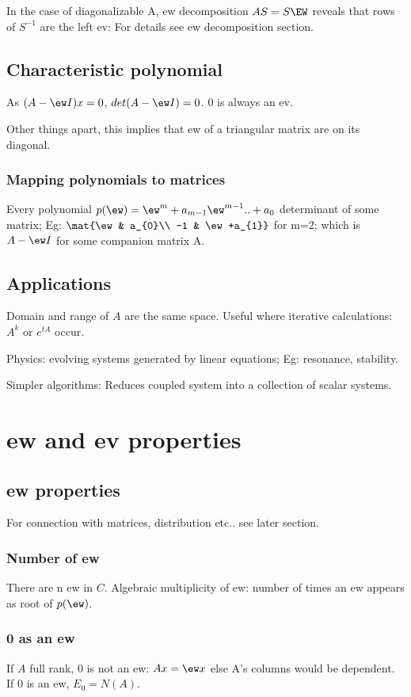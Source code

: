 \documentclass[oneside, article]{memoir}
\begin{document}
In the case of diagonalizable A, ew decomposition $AS = S \EW$ reveals that rows of $S^{-1}$ are the left ev: For details see ew decomposition section.

\subsection{Characteristic polynomial}
As $(A-\ew I)x = 0$, $det(A-\ew I)=0$. 0 is always an ev.

Other things apart, this implies that ew of a triangular matrix are on its diagonal.

\subsubsection{Mapping polynomials to matrices}
Every polynomial $p(\ew) = \ew^{m} + a_{m-1}\ew^{m-1} .. + a_{0}$ determinant of some matrix; Eg: $\mat{\ew & a_{0}\\ -1 & \ew+a_{1}}$ for m=2; which is $A-\ew I$ for some companion matrix A.

\subsection{Applications}
Domain and range of $A$ are the same space. Useful where iterative calculations: $A^{k}$ or $e^{tA}$ occur.

Physics: evolving systems generated by linear equations; Eg: resonance, stability.

Simpler algorithms: Reduces coupled system into a collection of scalar systems. \why



\section{ew and ev properties}
\subsection{ew properties}
For connection with matrices, distribution etc.. see later section.

\subsubsection{Number of ew}
There are n ew in $C$. Algebraic multiplicity of ew: number of times an ew appears as root of $p(\ew)$.

\subsubsection{0 as an ew}
If $A$ full rank, 0 is not an ew: $Ax=\ew x$ else A's columns would be dependent. If 0 is an ew, $E_{0} = N(A)$.
\end{document}
